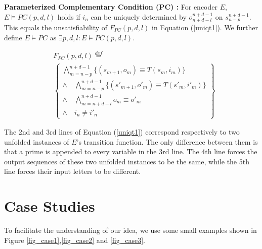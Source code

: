 \documentclass[journal]{IEEEtran}
\begin{document}
\begin{definition11}\label{def_pcc}%
\textbf{Parameterized Complementary Condition ($\boldsymbol{PC}$) :}
For encoder $E$,
$E\vDash PC(p,d,l)$ holds if
$i_n$ can be uniquely determined by $o_{n+d-l}^{n+d-1}$ on $s_{n-p}^{n+d-1}$.
This equals the unsatisfiability of $F_{PC}(p,d,l)$ in Equation (\ref{uniqt1}).
We further define $E\vDash PC$ as $\exists p,d,l:E\vDash PC(p,d,l)$.



\end{definition11}

\begin{equation}\label{uniqt1}
\begin{split}
&F_{PC}(p,d,l)\overset{def}{=}\\
&\left\{
\begin{array}{c}
\bigwedge_{m=n-p}^{n+d-1}
\{
(s_{m+1},o_m)\equiv T(s_m,i_m)
\}
\\
\wedge\quad\bigwedge_{m=n-p}^{n+d-1}
\{
(s'_{m+1},o'_m)\equiv T(s'_m,i'_m)
\}
\\
\wedge\quad\bigwedge_{m=n+d-l}^{n+d-1}o_m\equiv o'_m \\
\wedge\quad i_n\ne i'_n
\end{array}
\right\}
\end{split}
\end{equation}


The 2nd and 3rd lines of Equation (\ref{uniqt1}) correspond respectively to two unfolded instances of $E$'s transition function.
The only difference between them is that a prime is appended to every variable in the 3rd line.
The 4th line forces the output sequences of these two unfolded instances to be the same,
while the 5th line forces their input letters to be different.

\section{Case Studies}\label{sec_case}
To facilitate the understanding of our idea,
we use some small examples shown in Figure \ref{fig_case1},\ref{fig_case2} and \ref{fig_case3}.
\end{document}
